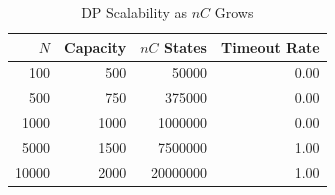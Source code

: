 \begin{table}[htbp]
\caption{DP Scalability as $nC$ Grows}
\label{tab:dp-scalability}
\centering
\begin{tabular}{@{}rrrr@{}}
\toprule
\rowcolor{tablehead}
$N$ & Capacity & $nC$ States & Timeout Rate \\
\midrule
100 & 500 & 50000 & 0.00 \\
500 & 750 & 375000 & 0.00 \\
1000 & 1000 & 1000000 & 0.00 \\
5000 & 1500 & 7500000 & 1.00 \\
10000 & 2000 & 20000000 & 1.00 \\
\bottomrule
\end{tabular}
\end{table}
